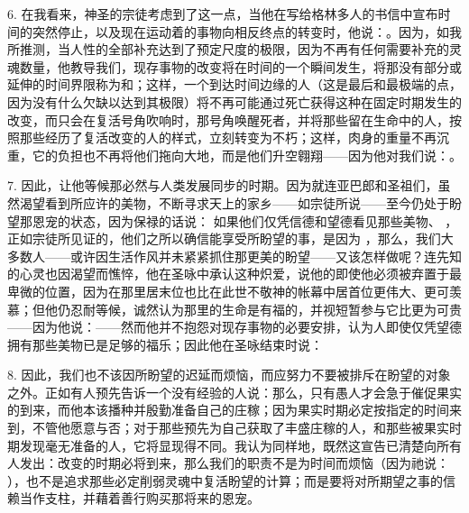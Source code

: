 6. 在我看来，神圣的宗徒考虑到了这一点，当他在写给格林多人的书信中宣布时间的突然停止，以及现在运动着的事物向相反终点的转变时，他说：。因为，如我所推测，当人性的全部补充达到了预定尺度的极限，因为不再有任何需要补充的灵魂数量，他教导我们，现存事物的改变将在时间的一个瞬间发生，将那没有部分或延伸的时间界限称为和；这样，一个到达时间边缘的人（这是最后和最极端的点，因为没有什么欠缺以达到其极限）将不再可能通过死亡获得这种在固定时期发生的改变，而只会在复活号角吹响时，那号角唤醒死者，并将那些留在生命中的人，按照那些经历了复活改变的人的样式，立刻转变为不朽；这样，肉身的重量不再沉重，它的负担也不再将他们拖向大地，而是他们升空翱翔——因为他对我们说：。\par

7. 因此，让他等候那必然与人类发展同步的时期。因为就连亚巴郎和圣祖们，虽然渴望看到所应许的美物，不断寻求天上的家乡——如宗徒所说——至今仍处于盼望那恩宠的状态，因为保禄的话说：   如果他们仅凭信德和望德看见那些美物、 ，正如宗徒所见证的，他们之所以确信能享受所盼望的事，是因为 ，那么，我们大多数人——或许因生活作风并未紧紧抓住那更美的盼望——又该怎样做呢？连先知的心灵也因渴望而憔悴，他在圣咏中承认这种炽爱，说他的即使他必须被弃置于最卑微的位置，因为在那里居末位也比在此世不敬神的帐幕中居首位更伟大、更可羡慕；但他仍忍耐等候，诚然认为那里的生命是有福的，并视短暂参与它比更为可贵——因为他说：——然而他并不抱怨对现存事物的必要安排，认为人即使仅凭望德拥有那些美物已是足够的福乐；因此他在圣咏结束时说：\par

8. 因此，我们也不该因所盼望的迟延而烦恼，而应努力不要被排斥在盼望的对象之外。正如有人预先告诉一个没有经验的人说：那么，只有愚人才会急于催促果实的到来，而他本该播种并殷勤准备自己的庄稼；因为果实时期必定按指定的时间来到，不管他愿意与否；对于那些预先为自己获取了丰盛庄稼的人，和那些被果实时期发现毫无准备的人，它将显现得不同。我认为同样地，既然这宣告已清楚向所有人发出：改变的时期必将到来，那么我们的职责不是为时间而烦恼（因为祂说： ），也不是追求那些必定削弱灵魂中复活盼望的计算；而是要将对所期望之事的信赖当作支柱，并藉着善行购买那将来的恩宠。\par

